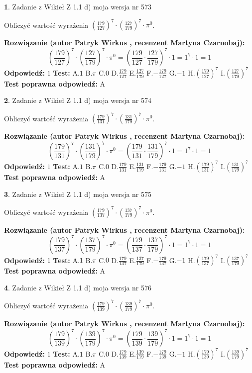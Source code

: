 \documentclass[12pt, a4paper]{article}
\theoremstyle{definition} %
\newtheorem{zad}{}
\newcommand{\zadStart}[1]{\begin{zad}#1\newline}
\newcommand{\zadStop}{\end{zad}}
\newcommand{\rozwStart}[2]{\noindent \textbf{Rozwiązanie (autor #1 , recenzent #2): }\newline}
\newcommand{\rozwStop}{\newline}
\newcommand{\odpStart}{\noindent \textbf{Odpowiedź:}\newline}
\newcommand{\odpStop}{\newline}
\newcommand{\testStart}{\noindent \textbf{Test:}\newline}
\newcommand{\testStop}{\newline}
\newcommand{\kluczStart}{\noindent \textbf{Test poprawna odpowiedź:}\newline}
\newcommand{\kluczStop}{\newline}
\begin{document}
\zadStart{Zadanie z Wikieł Z 1.1 d) moja wersja nr 573}

Obliczyć wartość wyrażenia $(\frac{179}{127})^{7} \cdot (\frac{127}{179})^{7} \cdot \pi^{0}$.
\zadStop
\rozwStart{Patryk Wirkus}{Martyna Czarnobaj}
$$(\frac{179}{127})^{7} \cdot (\frac{127}{179})^{7} \cdot \pi^{0} = (\frac{179}{127} \cdot \frac{127}{179})^{7} \cdot 1 = 1^{7} \cdot 1 = 1$$
\rozwStop
\odpStart
$1$
\odpStop
\testStart
A.$1$ B.$\pi$ C.$0$ D.$\frac{179}{127}$ E.$\frac{127}{179}$
F.$-\frac{179}{127}$ G.$-1$
H.$(\frac{179}{127})^{7}$
I.$(\frac{127}{179})^{7}$
\testStop
\kluczStart
A
\kluczStop



\zadStart{Zadanie z Wikieł Z 1.1 d) moja wersja nr 574}

Obliczyć wartość wyrażenia $(\frac{179}{131})^{7} \cdot (\frac{131}{179})^{7} \cdot \pi^{0}$.
\zadStop
\rozwStart{Patryk Wirkus}{Martyna Czarnobaj}
$$(\frac{179}{131})^{7} \cdot (\frac{131}{179})^{7} \cdot \pi^{0} = (\frac{179}{131} \cdot \frac{131}{179})^{7} \cdot 1 = 1^{7} \cdot 1 = 1$$
\rozwStop
\odpStart
$1$
\odpStop
\testStart
A.$1$ B.$\pi$ C.$0$ D.$\frac{179}{131}$ E.$\frac{131}{179}$
F.$-\frac{179}{131}$ G.$-1$
H.$(\frac{179}{131})^{7}$
I.$(\frac{131}{179})^{7}$
\testStop
\kluczStart
A
\kluczStop



\zadStart{Zadanie z Wikieł Z 1.1 d) moja wersja nr 575}

Obliczyć wartość wyrażenia $(\frac{179}{137})^{7} \cdot (\frac{137}{179})^{7} \cdot \pi^{0}$.
\zadStop
\rozwStart{Patryk Wirkus}{Martyna Czarnobaj}
$$(\frac{179}{137})^{7} \cdot (\frac{137}{179})^{7} \cdot \pi^{0} = (\frac{179}{137} \cdot \frac{137}{179})^{7} \cdot 1 = 1^{7} \cdot 1 = 1$$
\rozwStop
\odpStart
$1$
\odpStop
\testStart
A.$1$ B.$\pi$ C.$0$ D.$\frac{179}{137}$ E.$\frac{137}{179}$
F.$-\frac{179}{137}$ G.$-1$
H.$(\frac{179}{137})^{7}$
I.$(\frac{137}{179})^{7}$
\testStop
\kluczStart
A
\kluczStop



\zadStart{Zadanie z Wikieł Z 1.1 d) moja wersja nr 576}

Obliczyć wartość wyrażenia $(\frac{179}{139})^{7} \cdot (\frac{139}{179})^{7} \cdot \pi^{0}$.
\zadStop
\rozwStart{Patryk Wirkus}{Martyna Czarnobaj}
$$(\frac{179}{139})^{7} \cdot (\frac{139}{179})^{7} \cdot \pi^{0} = (\frac{179}{139} \cdot \frac{139}{179})^{7} \cdot 1 = 1^{7} \cdot 1 = 1$$
\rozwStop
\odpStart
$1$
\odpStop
\testStart
A.$1$ B.$\pi$ C.$0$ D.$\frac{179}{139}$ E.$\frac{139}{179}$
F.$-\frac{179}{139}$ G.$-1$
H.$(\frac{179}{139})^{7}$
I.$(\frac{139}{179})^{7}$
\testStop
\kluczStart
A
\kluczStop
\end{document}

